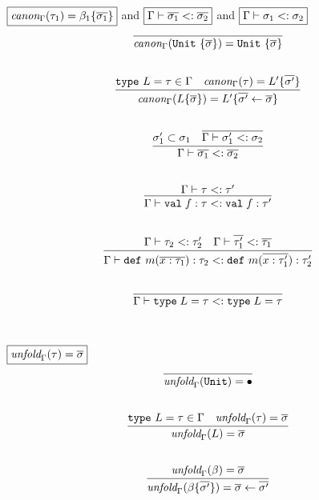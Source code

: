 \documentclass{article}
\newcommand{\keywadj}[1]{\mathtt{#1}}
\newcommand{\keyw}[1]{\keywadj{#1}~}
\begin{document}
$\fbox{$\textit{canon}_\Gamma(\tau_1) = \beta_1\{\overline{\sigma_1}\}$}$ and $\fbox{$\Gamma \vdash \overline{\sigma_1} <: \overline{\sigma_2}$}$  and $\fbox{$\Gamma \vdash \sigma_1 <: \sigma_2$}$
\[
\begin{array}{c}

\infer
  {\textit{canon}_\Gamma(\keyw{Unit}\{\overline{\sigma}\}) = \keyw{Unit}\{\overline{\sigma}\}}
  {}\\[5ex]

\infer
  {\textit{canon}_\Gamma(L\{\overline{\sigma}\}) = L'\{\overline{\sigma'} \leftarrow \overline{\sigma}\}}
  {\keyw{type} L = \tau \in \Gamma & \textit{canon}_\Gamma(\tau) = L'\{\overline{\sigma'}\}}\\[5ex]

\infer
  {\Gamma \vdash \overline{\sigma_1} <: \overline{\sigma_2}}
  {\sigma_1' \subset \sigma_1 & \overline{\Gamma \vdash \sigma_1' <: \sigma_2}}\\[5ex]
  
\infer
  {\Gamma \vdash \texttt{val} \; f:\tau <: \texttt{val} \; f:\tau'}
  {\Gamma \vdash \tau <: \tau'}\\[5ex]

\infer
  {\Gamma \vdash \keyw{def} m(\overline{x:\tau_1}) : \tau_2 <: \keyw{def} m(\overline{x:\tau_1'}) : \tau_2'}
  {\Gamma \vdash \tau_2 <: \tau_2' & \Gamma \vdash \overline{\tau_1'} <: \overline{\tau_1}}\\[5ex]

\infer
  {\Gamma \vdash \texttt{type} \; L = \tau <: \texttt{type} \; L = \tau}
  {}\\[5ex]

\end{array}
\]

$\fbox{$\textit{unfold}_\Gamma(\tau) = \overline{\sigma}$}$
\[
\begin{array}{c}

\infer
  {\textit{unfold}_\Gamma(\keywadj{Unit}) = \bullet}
  {}\\[5ex]
  
\infer
  {\textit{unfold}_\Gamma(L) = \overline{\sigma}}
  {\keyw{type} L = \tau \in \Gamma & \textit{unfold}_\Gamma(\tau) = \overline{\sigma}}\\[5ex]
  
\infer
  {\textit{unfold}_\Gamma(\beta \{\overline{\sigma'}\}) = \overline{\sigma} \leftarrow \overline{\sigma'}}
  {\textit{unfold}_\Gamma(\beta) = \overline{\sigma}}\\[5ex]
  
\end{array}
\]
\end{document}
